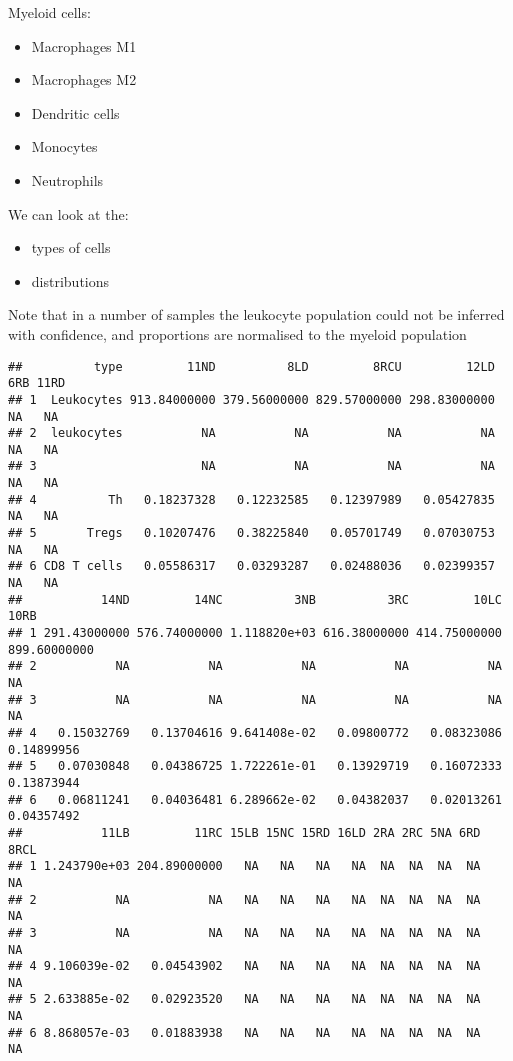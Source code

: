 \documentclass[
]{book}
\providecommand{\tightlist}{%
  \setlength{\itemsep}{0pt}\setlength{\parskip}{0pt}}
\begin{document}
Myeloid cells:

\begin{itemize}
\tightlist
\item
  Macrophages M1
\item
  Macrophages M2
\item
  Dendritic cells
\item
  Monocytes
\item
  Neutrophils
\end{itemize}

We can look at the:

\begin{itemize}
\tightlist
\item
  types of cells
\item
  distributions
\end{itemize}

Note that in a number of samples the leukocyte population could not be inferred with confidence, and proportions are normalised to the myeloid population

\begin{verbatim}
##          type         11ND          8LD         8RCU         12LD 6RB 11RD
## 1  Leukocytes 913.84000000 379.56000000 829.57000000 298.83000000  NA   NA
## 2  leukocytes           NA           NA           NA           NA  NA   NA
## 3                       NA           NA           NA           NA  NA   NA
## 4          Th   0.18237328   0.12232585   0.12397989   0.05427835  NA   NA
## 5       Tregs   0.10207476   0.38225840   0.05701749   0.07030753  NA   NA
## 6 CD8 T cells   0.05586317   0.03293287   0.02488036   0.02399357  NA   NA
##           14ND         14NC          3NB          3RC         10LC         10RB
## 1 291.43000000 576.74000000 1.118820e+03 616.38000000 414.75000000 899.60000000
## 2           NA           NA           NA           NA           NA           NA
## 3           NA           NA           NA           NA           NA           NA
## 4   0.15032769   0.13704616 9.641408e-02   0.09800772   0.08323086   0.14899956
## 5   0.07030848   0.04386725 1.722261e-01   0.13929719   0.16072333   0.13873944
## 6   0.06811241   0.04036481 6.289662e-02   0.04382037   0.02013261   0.04357492
##           11LB         11RC 15LB 15NC 15RD 16LD 2RA 2RC 5NA 6RD 8RCL
## 1 1.243790e+03 204.89000000   NA   NA   NA   NA  NA  NA  NA  NA   NA
## 2           NA           NA   NA   NA   NA   NA  NA  NA  NA  NA   NA
## 3           NA           NA   NA   NA   NA   NA  NA  NA  NA  NA   NA
## 4 9.106039e-02   0.04543902   NA   NA   NA   NA  NA  NA  NA  NA   NA
## 5 2.633885e-02   0.02923520   NA   NA   NA   NA  NA  NA  NA  NA   NA
## 6 8.868057e-03   0.01883938   NA   NA   NA   NA  NA  NA  NA  NA   NA
\end{verbatim}
\end{document}
